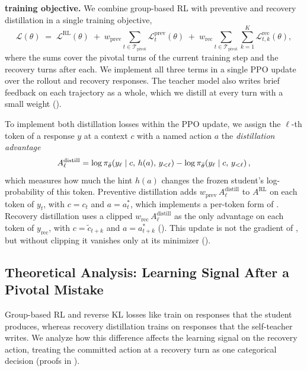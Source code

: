 \documentclass[10pt, logo, onecolumn, copyright]{nv}
\begin{document}
\textbf{\method{} training objective.}
We combine group-based RL with preventive and recovery distillation in a single training objective,
\begin{equation}
\mathcal{L}(\theta) \;=\; \mathcal{L}^{\mathrm{RL}}(\theta)
\;+\; w_\text{prev} \sum_{t \in \mathcal{T}_\text{pivot}} \mathcal{L}^{\mathrm{prev}}_{t}(\theta)
\;+\; w_\text{rec} \sum_{t \in \mathcal{T}_\text{pivot}} \sum_{k=1}^{K} \mathcal{L}^{\mathrm{rec}}_{t,k}(\theta),
\label{eq:objective}
\end{equation}
where the sums cover the pivotal turns of the current training step and the recovery turns after each. We implement all three terms in a single PPO update over the rollout and recovery responses. The teacher model also writes brief feedback on each trajectory as a whole, which we distill at every turn with a small weight ().

To implement both distillation losses within the PPO update, we assign the $\ell$-th token of a response $y$ at a context $c$ with a named action $a$ the \emph{distillation advantage}
\begin{equation}
A^{\mathrm{distill}}_\ell = \log \pi_{\bar\theta}\!\left(y_\ell \mid c,\, h(a),\, y_{<\ell}\right) - \log \pi_{\bar\theta}\!\left(y_\ell \mid c,\, y_{<\ell}\right),
\label{eq:distill_adv}
\end{equation}
which measures how much the hint $h(a)$ changes the frozen student's log-probability of this token. Preventive distillation adds $w_\text{prev}\, A^{\mathrm{distill}}_\ell$ to $A^{\mathrm{RL}}$ on each token of $y_t$, with $c = c_t$ and $a = a^{*}_t$, which implements a per-token form of . Recovery distillation uses a clipped $w_\text{rec}\, A^{\mathrm{distill}}_\ell$ as the only advantage on each token of $y_\text{rec}$, with $c = \tilde{c}_{t+k}$ and $a = a^{*}_{t+k}$ (). This update is not the gradient of , but without clipping it vanishes only at its minimizer ().



\subsection{Theoretical Analysis: Learning Signal After a Pivotal Mistake}
\label{sec:theory}

Group-based RL and reverse KL losses like  train on responses that the student produces, whereas recovery distillation trains on responses that the self-teacher writes. We analyze how this difference affects the learning signal on the recovery action, treating the committed action at a recovery turn as one categorical decision (proofs in ).
\end{document}
